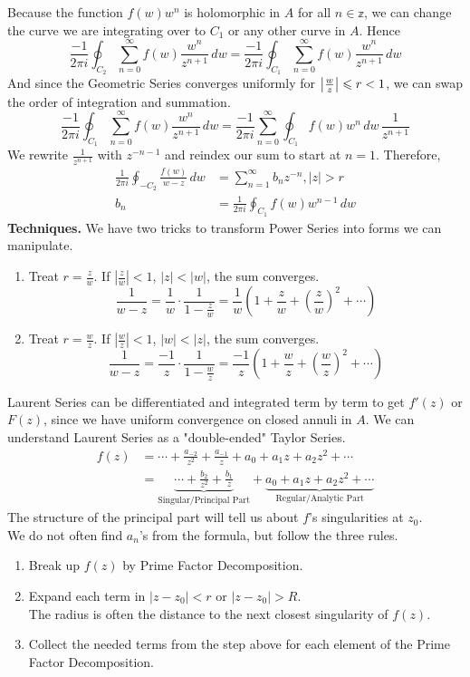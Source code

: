 \documentclass[11pt]{article}
\DeclarePairedDelimiter\abs{\lvert}{\rvert}
\begin{document}
Because the function $f(w)w^n$ is holomorphic in $A$ for all $n \in \mathbb{z}$, we can change the curve we are integrating over to $C_1$ or any other curve in $A$. Hence 
$$\frac{-1}{2\pi i}\oint_{C_2}\sum_{n = 0}^{\infty} f(w)\frac{w^n}{z^{n + 1}} \, dw = \frac{-1}{2\pi i}\oint_{C_1}\sum_{n = 0}^{\infty} f(w)\frac{w^n}{z^{n + 1}} \, dw $$
And since the Geometric Series converges uniformly for $\abs*{\frac{w}{z}} \leqslant r < 1$, we can swap the order of integration and summation.
$$\frac{-1}{2\pi i}\oint_{C_1}\sum_{n = 0}^{\infty} f(w)\frac{w^n}{z^{n + 1}} \, dw = \frac{-1}{2\pi i}\sum_{n = 0}^{\infty}\oint_{C_1} f(w)w^n \, dw \, \frac{1}{z^{n + 1}}$$
We rewrite $\frac{1}{z^{n + 1}}$ with $z^{-n - 1}$ and reindex our sum to start at $n = 1$. Therefore, 
\begin{align*}
\frac{1}{2\pi i}\oint_{-C_2}\frac{f(w)}{w - z} \,dw &= \sum_{n = 1}^{\infty} b_n z^{-n}, |z| > r \\
b_n &= \frac{1}{2\pi i}\oint_{C_1}f(w)w^{n - 1}\, dw 
\end{align*}
\newline
\textbf{Techniques.}
 We have two tricks to transform Power Series into forms we can manipulate. 
\begin{enumerate}
\item Treat $r = \frac{z}{w}$. If $|\frac{z}{w}| < 1$, $|z| < |w|$, the sum converges. 
$$\frac{1}{w - z} = \frac{1}{w}\cdot \frac{1}{1 - \frac{z}{w}} = \frac{1}{w}\left(1 + \frac{z}{w} + \left(\frac{z}{w}\right)^2+\cdots \right)$$
\item Treat $r = \frac{w}{z}$. If $|\frac{w}{z}| < 1$, $|w| < |z|$, the sum converges. 
$$\frac{1}{w - z} = \frac{-1}{z}\cdot \frac{1}{1 - \frac{w}{z}} = \frac{-1}{z}\left(1 + \frac{w}{z} + \left(\frac{w}{z}\right)^2+\cdots \right)$$
\end{enumerate}
\newpage
Laurent Series can be differentiated and integrated term by term to get $f'(z)$ or $F(z)$, since we have uniform convergence on closed annuli in $A$. We can understand Laurent Series as a "double-ended" Taylor Series. 
\begin{align*}
f(z) &= \cdots + \frac{a_{-2}}{z^2} + \frac{a_{-1}}{z} + a_0 + a_1z + a_2z^2 + \cdots \\ 
&= {\underbrace{\cdots + \frac{b_{2}}{z^2} + \frac{b_{1}}{z}}_\text{Singular/Principal Part}} + {\underbrace {a_0 + a_1z + a_2z^2 + \cdots}_\text{Regular/Analytic Part}}
\end{align*}
The structure of the principal part will tell us about $f$'s singularities at $z_0$. \\
We do not often find $a_n$'s from the formula, but follow the three rules. 
\begin{enumerate}
\item Break up $f(z)$ by Prime Factor Decomposition. 
\item Expand each term in $|z - z_0| < r$ or $|z - z_0| > R$. \\
The radius is often the distance to the next closest singularity of $f(z)$. 
\item Collect the needed terms from the step above for each element of the Prime Factor Decomposition. 
\end{enumerate} 
\end{document}
